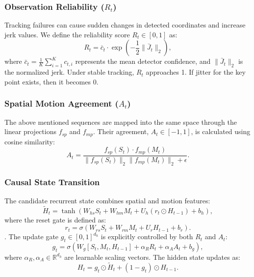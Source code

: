 \documentclass[conference]{IEEEtran}
\begin{document}
\subsubsection{Observation Reliability \texorpdfstring{($R_t$)}{(R_t)}}

Tracking failures can cause sudden changes in detected coordinates and increase jerk values. We define the reliability score $R_t \in [0,1]$ as:
\begin{equation}
R_t = \bar{c}_t \cdot \exp\left(-\frac{1}{2}\|\bar{J}_t\|_2\right),
\label{eq:reliability_math}
\end{equation}
where $\bar{c}_t = \frac{1}{K}\sum_{i=1}^{K} c_{t,i}$ represents the mean detector confidence, and $\|\bar{J}_t\|_2$ is the normalized jerk. Under stable tracking, $R_t$ approaches 1. If jitter for the key point exists, then it becomes 0.

\subsubsection{Spatial Motion Agreement \texorpdfstring{($A_t$)}{(A_t)}}

The above mentioned sequences are mapped into the same space through the linear projections $f_{sp}$ and $f_{mp}$. Their agreement, $A_t \in [-1,1]$, is calculated using cosine similarity:
\begin{equation}
A_t = \frac{f_{sp}(S_t) \cdot f_{mp}(M_t)}
{\|f_{sp}(S_t)\|_2 \|f_{mp}(M_t)\|_2 + \epsilon}.
\label{eq:agreement_math}
\end{equation}

\subsubsection{Causal State Transition}

The candidate recurrent state combines spatial and motion features:
\begin{equation}
\tilde{H}_t = \tanh\left(W_{hs} S_t + W_{hm} M_t + U_h (r_t \odot H_{t-1}) + b_h\right),
\label{eq:candidate_math}
\end{equation}
where the reset gate is defined as:
\begin{equation}
r_t = \sigma(W_{rs} S_t + W_{rm} M_t + U_r H_{t-1} + b_r).
\end{equation}. The update gate $g_t \in [0, 1]^{d_h}$ is explicitly controlled by both $R_t$ and $A_t$:
\begin{equation}
g_t = \sigma\left(W_g [S_t, M_t, H_{t-1}] + \alpha_R R_t + \alpha_A A_t + b_g\right),
\label{eq:racerx_gate_math}
\end{equation}
where $\alpha_R, \alpha_A \in \mathbb{R}^{d_h}$ are learnable scaling vectors. The hidden state updates as:
\begin{equation}
H_t = g_t \odot \tilde{H}_t + (1 - g_t) \odot H_{t-1}.
\label{eq:racerx_update_math}
\end{equation}
\end{document}
